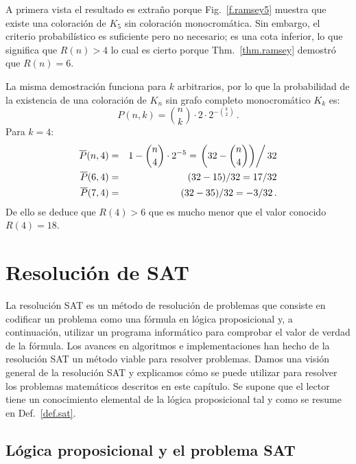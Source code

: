 A primera vista el resultado es extraño porque Fig.~\ref{f.ramsey5} muestra que existe una coloración de $K_5$ sin coloración monocromática. Sin embargo, el criterio probabilístico es suficiente pero no necesario; es una cota inferior, lo que significa que $R(n)>4$ lo cual es cierto porque Thm.~\ref{thm.ramsey} demostró que $R(n)=6$.

La misma demostración funciona para $k$ arbitrarios, por lo que la probabilidad de la existencia de una coloración de $K_n$ sin grafo completo monocromático $K_k$ es:
\[
P(n,k)=\binom{n}{k}\cdot 2\cdot 2^{-\binom{k}{2}}\,.
\]
Para $k=4$:
\begin{eqnarray*}
\overline{P}(n,4)&=&1-\binom{n}{4}\cdot 2^{-5}=\left.\left(32-\binom{n}{4}\right)\right/32\\
\overline{P}(6,4)&=&(32-15)/32=17/32\\
\overline{P}(7,4)&=&(32-35)/32=-3/32\,.
\end{eqnarray*}
De ello se deduce que $R(4)>6$ que es mucho menor que el valor conocido $R(4)=18$.


\section{Resolución de SAT}\label{s.sat}

La resolución SAT es un método de resolución de problemas que consiste en codificar un problema como una fórmula en lógica proposicional y, a continuación, utilizar un programa informático para comprobar el valor de verdad de la fórmula. Los avances en algoritmos e implementaciones han hecho de la resolución SAT un método viable para resolver problemas. Damos una visión general de la resolución SAT y explicamos cómo se puede utilizar para resolver los problemas matemáticos descritos en este capítulo. Se supone que el lector tiene un conocimiento elemental de la lógica proposicional tal y como se resume en Def.~\ref{def.sat}.

\subsection{Lógica proposicional y el problema SAT}


